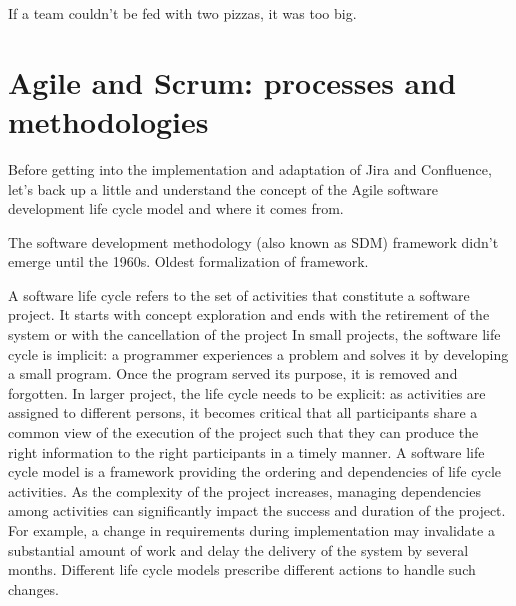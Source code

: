 \begin{savequote}[75mm]
If a team couldn’t be fed with two pizzas, it was too big.
\end{savequote}



\chapter{Agile and Scrum: processes and methodologies}

Before getting into the implementation and adaptation of Jira and Confluence, let's back up a little and understand the concept of the Agile software development life cycle model and where it comes from.

The software development methodology (also known as SDM) framework didn't emerge until the 1960s.
Oldest formalization of framework.

A software life cycle refers to the set of activities that constitute a software project.
It starts with concept exploration and ends with the retirement of the system or with the cancellation of the project
In small projects, the software life cycle is implicit: a programmer experiences a problem and solves it by developing a small program. 
Once the program served its purpose, it is removed and forgotten. 
In larger project, the life cycle needs to be explicit: as activities are assigned to different persons, it becomes critical that all participants share a common view of the execution of the project such that they can produce the right information to the right participants in a timely manner. 
A software life cycle model is a framework providing the ordering and dependencies of life cycle activities. 
As the complexity of the project increases, managing dependencies among activities can significantly impact the success and duration of the project. 
For example, a change in requirements during implementation may invalidate a substantial amount of work and delay the delivery of the system by several months. 
Different life cycle models prescribe different actions to handle such changes.

